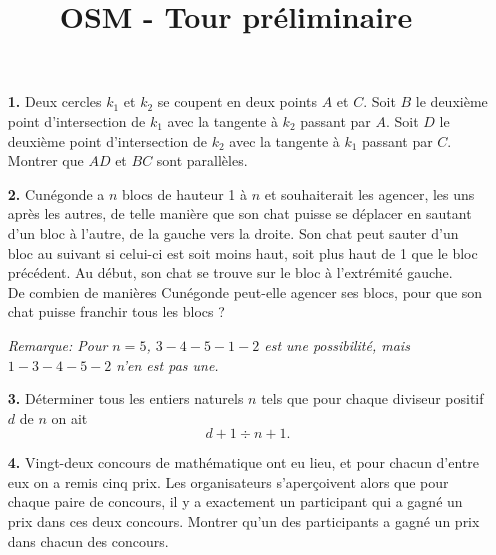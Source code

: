 \documentclass[language=french,style=exam]{smo}
\title{OSM - Tour préliminaire}
\begin{document}
\begin{enumerate}

\item[\textbf{1.}] 
Deux cercles $k_1$ et $k_2$ se coupent en deux points $A$ et $C$. Soit $B$ le deuxième point d'intersection de $k_1$ avec la tangente à $k_2$ passant par $A$. Soit $D$ le deuxième point d'intersection de $k_2$ avec la tangente à $k_1$ passant par $C$. Montrer que $AD$ et $BC$ sont parallèles.

\bigskip

\item[\textbf{2.}] 
Cunégonde a $n$ blocs de hauteur 1 à $n$ et souhaiterait les agencer, les uns après les autres, de telle manière que son chat puisse se déplacer en sautant d'un bloc à l'autre, de la gauche vers la droite. Son chat peut sauter d'un bloc au suivant si celui-ci est soit moins haut, soit plus haut de 1 que le bloc précédent. Au début, son chat se trouve sur le bloc à l'extrémité gauche.\\
De combien de manières Cunégonde peut-elle agencer ses blocs, pour que son chat puisse franchir tous les blocs ?


\textit{Remarque: Pour $n=5$, $3-4-5-1-2$ est une possibilité, mais $1-3-4-5-2$ n'en est pas une.} 

\bigskip

\item[\textbf{3.}]
Déterminer tous les entiers naturels $n$ tels que pour chaque diviseur positif $d$ de $n$ on ait 
\[
d+1 \div n+1.
\]

\bigskip

\item[\textbf{4.}] 
Vingt-deux concours de mathématique ont eu lieu, et pour chacun d'entre eux on a remis cinq prix. Les organisateurs s'aperçoivent alors que pour chaque paire de concours, il y a exactement un participant qui a gagné un prix dans ces deux concours. Montrer qu'un des participants a gagné un prix dans chacun des concours.


\end{enumerate}
\end{document}
